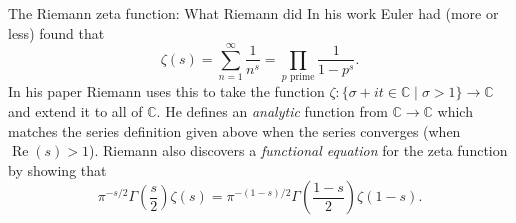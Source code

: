 \documentclass{beamer}
\begin{document}
\begin{frame}{The Riemann zeta function: What Riemann did}
In his work Euler had (more or less) found that 
\[\zeta(s) = \sum_{n=1}^{\infty}\frac{1}{n^s} = \prod_{p \text{ prime}}\frac{1}{1-p^s}.\]
\pause In his paper Riemann uses this to take the function $\zeta\colon \{\sigma + it \in\mathbb{C}\mid \sigma > 1\} \to \mathbb{C}$ and extend it to all of $\mathbb{C}$.
\pause He defines an \emph{analytic} function from $\mathbb{C} \to \mathbb{C}$ which matches the series definition given above when the series converges (when $\operatorname{Re}(s) > 1$).
\pause Riemann also discovers a \emph{functional equation} for the zeta function by showing that
\[ \pi^{-s/2} \Gamma\left(\frac{s}{2}\right)\zeta(s) = \pi^{-(1-s)/2} \Gamma\left(\frac{1-s}{2}\right) \zeta(1-s).\]
\end{frame}
\end{document}
